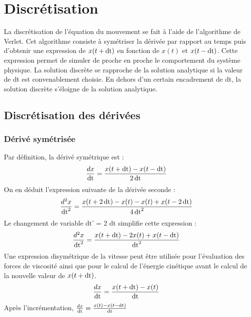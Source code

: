 
\section{Discrétisation}
%
La discrétisation de l'équation du mouvement se fait à l'aide de l'algorithme de Verlet. Cet algorithme consiste à symétriser la dérivée par rapport au temps puis d'obtenir une expression de $x(t+\operatorname{dt})$ en fonction de $x(t)$ et $x(t-\operatorname{dt})$. Cette expression permet de simuler de proche en proche le comportement du système physique. La solution discrète se rapproche de la solution analytique si la valeur de dt est convenablement choisie. En dehors d'un certain encadrement de dt, la solution discrète s'éloigne de la solution analytique.
%
\subsection{Discrétisation des dérivées}
%
\subsubsection{Dérivé symétrisée}
Par définition, la dérivé symétrique est :
\[
\frac{dx}{\operatorname{dt}}=\frac{x(t+\operatorname{dt})-x(t-\operatorname{dt})}{2\operatorname{dt}}
\]
On en déduit l'expression suivante de la dérivée seconde :
\[
\frac{d^2x}{\operatorname{dt}^2}=\frac{x(t+2\operatorname{dt})-x(t)-x(t)+x(t-2\operatorname{dt})}{4\operatorname{dt}^2}
\]
Le changement de variable dt' = 2 dt simplifie cette expression :
\[
\frac{d^2x}{\operatorname{dt}^2}=\frac{x(t+\operatorname{dt})-2x(t)+x(t-\operatorname{dt})}{\operatorname{dt}^2}
\]
Une expression disymétrique de la vitesse peut être utilisée pour l'évaluation des forces de viscosité ainsi que pour le calcul de l'énergie cinétique avant le calcul de la nouvelle valeur de $x(t+\operatorname{dt})$.
\[
\frac{dx}{\operatorname{dt}}=\frac{x(t+\operatorname{dt})-x(t)}{\operatorname{dt}}
\]
{\footnotesize Après l'incrémentation, } $\frac{dx}{\operatorname{dt}}=\frac{x(t)-x(t-\operatorname{dt})}{\operatorname{dt}}$
%
